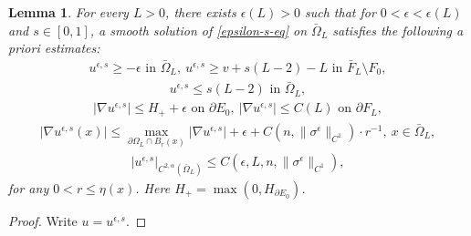 \documentclass[11pt, letterpaper]{amsart}
\newtheorem{lem}[thm]{Lemma}
\theoremstyle{definition}
\theoremstyle{remark}
\begin{document}
\begin{appendix}
\begin{lem}\label{appen-apriori-estimates}
	For every $L>0$, there exists $\epsilon (L)>0$ such that for $0< \epsilon < \epsilon (L)$ and $s \in [0,1]$, a smooth solution of \ref{epsilon-s-eq} on $\bar{\Omega }_{L}$ satisfies the following a priori estimates:
	\begin{align}
		u^{\epsilon ,s} \geq - \epsilon \text{ in } \bar{\Omega }_{L},\ u^{\epsilon ,s} \geq v+ s(L-2) -L \text{ in } \bar{F}_{L}\setminus F_0,
	\end{align} 
	\begin{align}
		u^{\epsilon, s } \leq s(L-2) \text{ in } \bar{\Omega }_{L},
	\end{align}
	\begin{align}
		|\nabla u^{\epsilon ,s}| \leq H_{+}  + \epsilon \text{ on } \partial E_0,\ |\nabla u^{\epsilon ,s}| \leq C(L) \text{ on } \partial F_{L},
	\end{align}
	\begin{align}
		|\nabla u^{\epsilon ,s}(x)| \leq \max_{\partial \Omega _{L} \cap B_r(x)}|\nabla u^{\epsilon ,s}| + \epsilon + C(n, \|\sigma^{\epsilon } \|_{C^1}) \cdot r ^{-1}, \ x \in \bar{\Omega }_{L},
	\end{align}
	\begin{align}
		|u^{\epsilon ,s}|_{C^{2, \alpha }(\bar{\Omega }_{L})} \leq C(\epsilon , L, n, \|\sigma ^{\epsilon }\|_{C^1}),
	\end{align}
	for any $0<r\leq \eta (x)$. Here $H_{+}= \max(0, H_{\partial E_0})$.
\end{lem}

\begin{proof}
	Write $u = u ^{\epsilon ,s}$. 


\end{proof}
\end{appendix}
\end{document}
